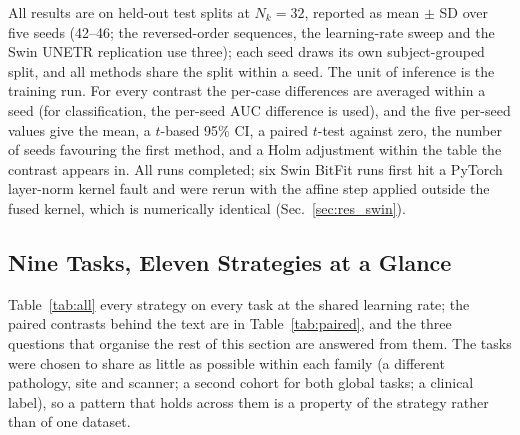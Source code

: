 \iffull\documentclass[journal]{IEEEtran}\else\documentclass[journal,twoside,web]{ieeecolor}\usepackage{generic}\fi
\begin{document}
All results are on held-out test splits at $N_k=32$, reported as mean $\pm$ SD over five seeds (42--46; the reversed-order sequences, the learning-rate sweep and the Swin UNETR replication use three); each seed draws its own subject-grouped split, and all methods share the split within a seed. The unit of inference is the training run. For every contrast the per-case differences are averaged within a seed (for classification, the per-seed AUC difference is used), and the five per-seed values give the mean, a $t$-based 95\% CI, a paired $t$-test against zero, the number of seeds favouring the first method, and a Holm adjustment within the table the contrast appears in.  All \nruns{} runs completed; six Swin BitFit runs first hit a PyTorch layer-norm kernel fault and were rerun with the affine step applied outside the fused kernel, which is numerically identical (Sec.~\ref{sec:res_swin}).

\subsection{Nine Tasks, Eleven Strategies at a Glance}
\label{sec:res_overview}\label{sec:main}\label{sec:res_replicate}

Table~\ref{tab:all} every strategy on every task at the shared learning rate; the paired contrasts behind the text are in Table~\ref{tab:paired}, and the three questions that organise the rest of this section are answered from them. The tasks were chosen to share as little as possible within each family (a different pathology, site and scanner; a second cohort for both global tasks; a clinical label), so a pattern that holds across them is a property of the strategy rather than of one dataset.
\end{document}
